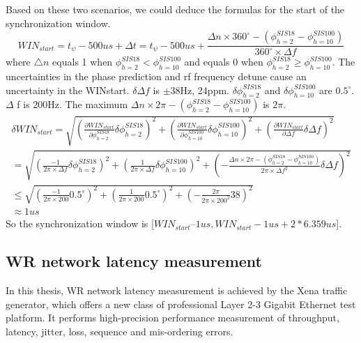 Based on these two scenarios, we could deduce the formulas for the start of the synchronization window. 
	\begin{equation}
	 WIN_{start} = t_{\psi} - 500us + \Delta t =t_{\psi} - 500us +\frac {{\Delta n} \times {360^\circ} - (\phi_{h=2}^{SIS18}-\phi_{h=10}^{SIS100})}{{360^\circ} \times {\Delta f}} \label {beating_win_2}
   \end{equation}
where $\bigtriangleup{n}$ equals 1 when  $\phi_{h=2}^{SIS18} < \phi_{h=10}^{SIS100}$ and equals 0 when  $\phi_{h=2}^{SIS18} \ge \phi_{h=10}^{SIS100}$.
The uncertainties in the phase prediction and rf frequency detune cause an uncertainty in the WINstart. $\delta \Delta f$ is $\pm$38Hz, 24ppm. $\delta \phi_{h=2}^{SIS18}$ and $\delta \phi_{h=10}^{SIS100}$ are $0.5^\circ$. $\Delta$ f is 200Hz. The maximum ${\Delta n} \times {2\pi} - (\phi_{h=2}^{SIS18}-\phi_{h=10}^{SIS100})$ is $2\pi$.
\begin{equation}
\begin{aligned}
\delta WIN_{start} =\sqrt {(\frac {\partial WIN_{start}}{\partial \phi_{h=2}^{SIS18}}\delta \phi_{h=2}^{SIS18})^2 + (\frac {\partial WIN_{start}}{\partial \phi_{h=10}^{SIS100}}\delta \phi_{h=10}^{SIS100})^2+(\frac {\partial WIN_{start}}{\partial \Delta f}\delta \Delta f)^2} \\
 =\sqrt {(\frac{-1}{{2\pi} \times {\Delta f}}\delta \phi_{h=2}^{SIS18})^2+(\frac{1}{{2\pi} \times {\Delta f}}\delta \phi_{h=10}^{SIS100})^2+(-\frac{{\Delta n} \times {2\pi} - (\phi_{h=2}^{SIS18}-\phi_{h=10}^{SIS100})}{{2\pi} \times {\Delta f}^2}\delta \Delta f)^2} \\
\le \sqrt {(\frac{-1}{{2\pi} \times {200}}0.5^\circ)^2+(\frac{1}{{2\pi} \times {200}}0.5^\circ)^2+(-\frac{2\pi}{{2\pi} \times {200}^2}38)^2}\\
\approx 1us \label{beating_uncertainty}
\end{aligned}
\end{equation}
So the synchronization window is [$WIN_{start} – 1us, WIN_{start} - 1us + 2 * 6.359us$].
\subsection{WR network latency measurement}
In this thesis, WR network latency measurement is achieved by the Xena traffic generator, which offers a new class of professional Layer 2-3 Gigabit Ethernet test platform. It performs high-precision performance measurement of throughput, latency, jitter, loss, sequence and mis-ordering errors.

